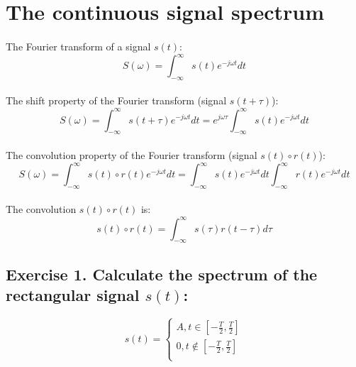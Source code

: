 \documentclass[14pt]{article}
\begin{document}
\Large

\section{The continuous signal spectrum}

\paragraph{}
The Fourier transform of a signal $ s(t) $:
\begin{equation} \label{Fourier}
	S(\omega) 
	=
	\int_{-\infty}^\infty s(t) e^{-j \omega t} {d}t
\end{equation}

\paragraph{}
The shift property of the Fourier transform (signal $ s(t + \tau) $):
\begin{equation} \label{Fourier shift}
	S(\omega) 
	=
	\int_{-\infty}^\infty s(t + \tau) e^{-j \omega t} {d}t 
	=
	e^{j \omega \tau} \int_{-\infty}^\infty s(t) e^{-j \omega t} {d}t
\end{equation}

\paragraph{}
The convolution property of the Fourier transform 
	(signal $ s(t) \circ r(t) $):
\begin{equation} \label{Fourier convolution}
	S(\omega)
	=
	\int_{-\infty}^\infty s(t) \circ r(t) e^{-j \omega t} {d}t 
	=
	\int_{-\infty}^\infty s(t) e^{-j \omega t} {d}t 
		\int_{-\infty}^\infty r(t) e^{-j \omega t} {d}t
\end{equation}

\paragraph{}
The convolution $ s(t) \circ r(t) $ is:
\begin{equation} \label{Convolution}
	s(t) \circ r(t) 
	=
	\int_{-\infty}^\infty s(\tau) r(t - \tau) {d}\tau
\end{equation}

\subsection{Exercise 1. Calculate the spectrum of the rectangular 
	signal $ s(t) $:}
\begin{equation} \label{Exercise 1.1}
	s(t) 
	=
	\left\{  
	\begin{array}{rcl}  
		A, t \in [-\frac{T}{2}, \frac{T}{2}]\\  
		0, t \notin [-\frac{T}{2}, \frac{T}{2}]\\  
	\end{array}
	\right.  
\end{equation} 
\end{document}
